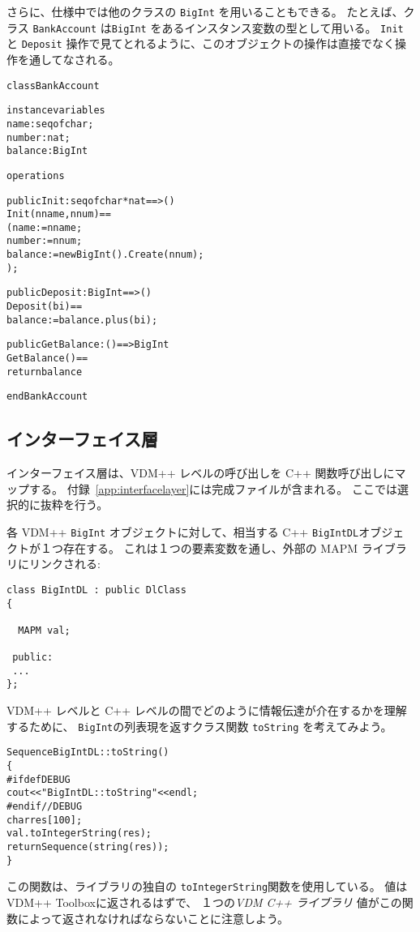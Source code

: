 \documentclass[\pformat,12pt]{jarticle}
\newcommand{\vdmcpplib}{\textit{VDM C++ ライブラリ}}
\begin{document}
さらに、仕様中では他のクラスの \texttt{BigInt} を用いることもできる。
たとえば、クラス \texttt{BankAccount} は\texttt{BigInt} をあるインスタンス変数の型として用いる。
 \texttt{Init} と \texttt{Deposit} 操作で見てとれるように、このオブジェクトの操作は直接でなく操作を通してなされる。

\begin{alltt}
\textsf{class} BankAccount

\textsf{instance} \textsf{variables}
  name : \textsf{seq} \textsf{of} \textsf{char};
  number : \textsf{nat};
  balance : BigInt

\textsf{operations}

\textsf{public} Init : \textsf{seq} \textsf{of} \textsf{char} * \textsf{nat} ==> ()
Init(nname, nnum) ==
( name := nname;
  number := nnum;
  balance := new BigInt().Create(nnum);
);

\textsf{public} Deposit : BigInt ==> ()
Deposit(bi) ==
  balance := balance.plus(bi);

\textsf{public} GetBalance : () ==> BigInt
GetBalance() ==
  \textsf{return} balance

\textsf{end} BankAccount
\end{alltt}


\subsection{インターフェイス層}

インターフェイス層は、VDM++ レベルの呼び出しを C++ 関数呼び出しにマップする。
付録~\ref{app:interfacelayer}には完成ファイルが含まれる。
ここでは選択的に抜粋を行う。

各 VDM++ \texttt{BigInt} オブジェクトに対して、相当する C++ \texttt{BigIntDL}オブジェクトが１つ存在する。 
これは１つの要素変数を通し、外部の MAPM ライブラリにリンクされる: 
\begin{verbatim}
class BigIntDL : public DlClass
{

  MAPM val;
 
 public:
 ...
};
\end{verbatim}



 VDM++ レベルと C++ レベルの間でどのように情報伝達が介在するかを理解するために、 \texttt{BigInt}の列表現を返すクラス関数 \texttt{toString} を考えてみよう。

\begin{alltt}
Sequence BigIntDL::toString()
\{
\#ifdef DEBUG
  cout << "BigIntDL::toString" << endl;
\#endif //DEBUG
  char res[100];
  val.toIntegerString(res);
  return Sequence(string(res));
\}
\end{alltt}
この関数は、ライブラリの独自の \texttt{toIntegerString}関数を使用している。 
値は VDM++ Toolboxに返されるはずで、 １つの{\vdmcpplib} 値がこの関数によって返されなければならないことに注意しよう。 
\end{document}
